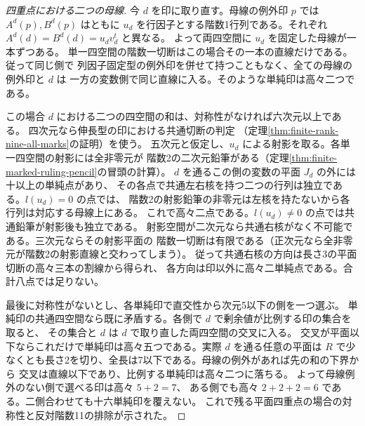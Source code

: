 \begin{proof}[四重点における二つの母線]
今 $d$ を印に取り直す。母線の例外印 $p$ では $A^d(p),B^d(p)$ はともに
$u_d$ を行因子とする階数1行列である。それぞれ $A^d(d)=B^d(d)=u_dv_d^t$ と異なる。
よって両四空間に $u_d$ を固定した母線が一本ずつある。
単一四空間の階数一切断はこの場合その一本の直線だけである。従って同じ側で
列因子固定型の例外印を併せて持つこともなく、全ての母線の例外印と $d$ は
一方の変数側で同じ直線に入る。そのような単純印は高々二つである。

この場合 $d$ における二つの四空間の和は、対称性がなければ六次元以上である。
四次元なら伸長型の印における共通切断の判定
（定理\ref{thm:finite-rank-nine-all-marks}の証明）を使う。
五次元と仮定し、$u_d$ による射影を取る。各単一四空間の射影には全非零元が
階数2の二次元鉛筆がある（定理\ref{thm:finite-marked-ruling-pencil}の冒頭の計算）。
$d$ を通るこの側の変数の平面 $J_d$ の外には十以上の単純点があり、
その各点で共通左右核を持つ二つの行列は独立である。$l(u_d)=0$ の点では、
階数2の射影鉛筆の非零元は左核を持たないから各行列は対応する母線上にある。
これで高々二点である。$l(u_d)\ne0$ の点では共通鉛筆が射影後も独立である。
射影空間が二次元なら共通右核がなく不可能である。三次元ならその射影平面の
階数一切断は有限である（正次元なら全非零元が階数2の射影直線と交わってしまう）。
従って共通右核の方向は長さ3の平面切断の高々三本の割線から得られ、
各方向は印以外に高々二単純点である。合計八点では足りない。

最後に対称性がないとし、各単純印で直交性から次元5以下の側を一つ選ぶ。
単純印の共通四空間なら既に矛盾する。各側で $d$ で剰余値が比例する印の集合を取ると、
その集合と $d$ は $d$ で取り直した両四空間の交叉に入る。
交叉が平面以下ならこれだけで単純印は高々五つである。実際 $d$ を通る任意の平面は
$R$ で少なくとも長さ2を切り、全長は7以下である。母線の例外があれば先の和の下界から
交叉は直線以下であり、比例する単純印は高々二つに落ちる。
よって母線例外のない側で選べる印は高々 $5+2=7$、
ある側でも高々 $2+2+2=6$ である。二側合わせても十六単純印を覆えない。
これで残る平面四重点の場合の対称性と反対階数11の排除が示された。
\end{proof}
